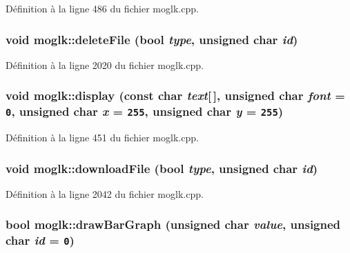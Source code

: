 Définition à la ligne 486 du fichier moglk.cpp.\hypertarget{classmoglk_a1953b9ffbeb39433686cb30fe72cdab}{
\subsubsection[{deleteFile}]{\setlength{\rightskip}{0pt plus 5cm}void moglk::deleteFile (bool {\em type}, \/  unsigned char {\em id})}}
\label{classmoglk_a1953b9ffbeb39433686cb30fe72cdab}




Définition à la ligne 2020 du fichier moglk.cpp.\hypertarget{classmoglk_cf30cd08a2e1434e68b386236f4060bd}{
\subsubsection[{display}]{\setlength{\rightskip}{0pt plus 5cm}void moglk::display (const char {\em text}\mbox{[}$\,$\mbox{]}, \/  unsigned char {\em font} = {\tt 0}, \/  unsigned char {\em x} = {\tt 255}, \/  unsigned char {\em y} = {\tt 255})}}
\label{classmoglk_cf30cd08a2e1434e68b386236f4060bd}




Définition à la ligne 451 du fichier moglk.cpp.\hypertarget{classmoglk_f8a03d73de173bee806acf9d51cba608}{
\subsubsection[{downloadFile}]{\setlength{\rightskip}{0pt plus 5cm}void moglk::downloadFile (bool {\em type}, \/  unsigned char {\em id})}}
\label{classmoglk_f8a03d73de173bee806acf9d51cba608}




Définition à la ligne 2042 du fichier moglk.cpp.\hypertarget{classmoglk_cf8048cc54c879ae2ee4942ce451c108}{
\subsubsection[{drawBarGraph}]{\setlength{\rightskip}{0pt plus 5cm}bool moglk::drawBarGraph (unsigned char {\em value}, \/  unsigned char {\em id} = {\tt 0})}}
\label{classmoglk_cf8048cc54c879ae2ee4942ce451c108}




